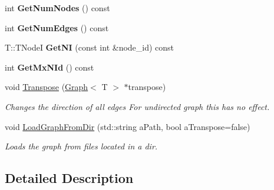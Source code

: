 \begin{DoxyCompactItemize}
\item 
\hypertarget{classall__distance__sketch_1_1graph_1_1Graph_ac15516bbdf0a0784ae08f36ffe6d127d}{}int {\bfseries Get\+Num\+Nodes} () const \label{classall__distance__sketch_1_1graph_1_1Graph_ac15516bbdf0a0784ae08f36ffe6d127d}

\item 
\hypertarget{classall__distance__sketch_1_1graph_1_1Graph_af5ec8f358494cd0ee09ebb4a772bdb40}{}int {\bfseries Get\+Num\+Edges} () const \label{classall__distance__sketch_1_1graph_1_1Graph_af5ec8f358494cd0ee09ebb4a772bdb40}

\item 
\hypertarget{classall__distance__sketch_1_1graph_1_1Graph_a13b839edcd7636b5c85a6b8ce3883f9d}{}T\+::\+T\+Node\+I {\bfseries Get\+N\+I} (const int \&node\+\_\+id) const \label{classall__distance__sketch_1_1graph_1_1Graph_a13b839edcd7636b5c85a6b8ce3883f9d}

\item 
\hypertarget{classall__distance__sketch_1_1graph_1_1Graph_a85ded127ea770a1132802e6828ba231a}{}int {\bfseries Get\+Mx\+N\+Id} () const \label{classall__distance__sketch_1_1graph_1_1Graph_a85ded127ea770a1132802e6828ba231a}

\item 
\hypertarget{classall__distance__sketch_1_1graph_1_1Graph_a815e0dd181344a9834b65021f2973887}{}void \hyperlink{classall__distance__sketch_1_1graph_1_1Graph_a815e0dd181344a9834b65021f2973887}{Transpose} (\hyperlink{classall__distance__sketch_1_1graph_1_1Graph}{Graph}$<$ T $>$ $\ast$transpose)\label{classall__distance__sketch_1_1graph_1_1Graph_a815e0dd181344a9834b65021f2973887}

\begin{DoxyCompactList}\small\item\em Changes the direction of all edges For undirected graph this has no effect. \end{DoxyCompactList}\item 
void \hyperlink{classall__distance__sketch_1_1graph_1_1Graph_ad219191cafee53dfdd1fee987f256b18}{Load\+Graph\+From\+Dir} (std\+::string a\+Path, bool a\+Transpose=false)
\begin{DoxyCompactList}\small\item\em Loads the graph from files located in a dir. \end{DoxyCompactList}\end{DoxyCompactItemize}


\subsection{Detailed Description}
